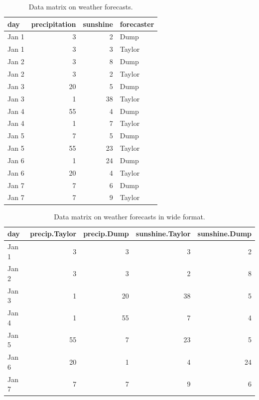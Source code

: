 \documentclass[]{report}\usepackage[]{graphicx}\usepackage[]{color}
\begin{document}
\begin{table}[ht]
\centering
\caption{Data matrix on weather forecasts.} 
\label{tab:data_5}
\begin{tabular}{lrrl}
  \hline
day & precipitation & sunshine & forecaster \\ 
  \hline
Jan 1 & 3 & 2 & Dump \\ 
  Jan 1 & 3 & 3 & Taylor \\ 
  Jan 2 & 3 & 8 & Dump \\ 
  Jan 2 & 3 & 2 & Taylor \\ 
  Jan 3 & 20 & 5 & Dump \\ 
  Jan 3 & 1 & 38 & Taylor \\ 
  Jan 4 & 55 & 4 & Dump \\ 
  Jan 4 & 1 & 7 & Taylor \\ 
  Jan 5 & 7 & 5 & Dump \\ 
  Jan 5 & 55 & 23 & Taylor \\ 
  Jan 6 & 1 & 24 & Dump \\ 
  Jan 6 & 20 & 4 & Taylor \\ 
  Jan 7 & 7 & 6 & Dump \\ 
  Jan 7 & 7 & 9 & Taylor \\ 
   \hline
\end{tabular}
\end{table}


\begin{table}[ht]
\centering
\caption{Data matrix on weather forecasts in wide format.} 
\label{tab:data_5b}
\begin{tabular}{lrrrr}
  \hline
day & precip.Taylor & precip.Dump & sunshine.Taylor & sunshine.Dump \\ 
  \hline
Jan 1 & 3 & 3 & 3 & 2 \\ 
  Jan 2 & 3 & 3 & 2 & 8 \\ 
  Jan 3 & 1 & 20 & 38 & 5 \\ 
  Jan 4 & 1 & 55 & 7 & 4 \\ 
  Jan 5 & 55 & 7 & 23 & 5 \\ 
  Jan 6 & 20 & 1 & 4 & 24 \\ 
  Jan 7 & 7 & 7 & 9 & 6 \\ 
   \hline
\end{tabular}
\end{table}
\end{document}
